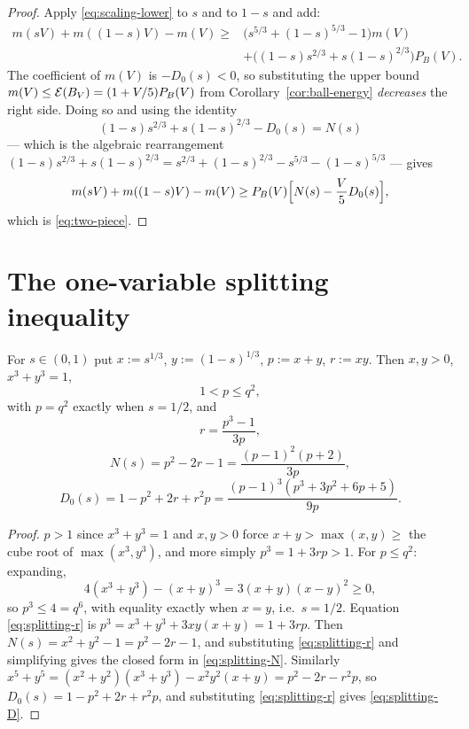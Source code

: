 \begin{proof}
Apply \eqref{eq:scaling-lower} to $s$ and to $1-s$ and add:
\begin{equation}\label{eq:two-piece-raw}
\begin{aligned}
  m(sV)+m((1-s)V)-m(V)
  \ge{}&\bigl(s^{5/3}+(1-s)^{5/3}-1\bigr)m(V)\\
  &+\bigl((1-s)s^{2/3}+s(1-s)^{2/3}\bigr)P_B(V).
\end{aligned}
\end{equation}
The coefficient of $m(V)$ is $-D_0(s)<0$, so substituting the upper bound
$m(V)\le\mathcal E(B_V)=(1+V/5)P_B(V)$ from
Corollary~\ref{cor:ball-energy} \emph{decreases} the right side.  Doing so and
using the identity
\[
  (1-s)s^{2/3}+s(1-s)^{2/3}-D_0(s)
  = N(s)
\]
--- which is the algebraic rearrangement
$(1-s)s^{2/3}+s(1-s)^{2/3}
 =s^{2/3}+(1-s)^{2/3}-s^{5/3}-(1-s)^{5/3}$ --- gives
\[
  m(sV)+m((1-s)V)-m(V)\ge P_B(V)\Bigl[N(s)-\frac V5D_0(s)\Bigr],
\]
which is \eqref{eq:two-piece}.
\end{proof}

\section{The one-variable splitting inequality}

\begin{lemma}\label{lem:splitting-substitution}
For $s\in(0,1)$ put $x:=s^{1/3}$, $y:=(1-s)^{1/3}$, $p:=x+y$, $r:=xy$.  Then
$x,y>0$, $x^3+y^3=1$,
\begin{equation}\label{eq:splitting-p-range}
  1<p\le q^2,
\end{equation}
with $p=q^2$ exactly when $s=1/2$, and
\begin{equation}\label{eq:splitting-r}
  r=\frac{p^3-1}{3p},
\end{equation}
\begin{equation}\label{eq:splitting-N}
  N(s)=p^2-2r-1=\frac{(p-1)^2(p+2)}{3p},
\end{equation}
\begin{equation}\label{eq:splitting-D}
  D_0(s)=1-p^2+2r+r^2p
        =\frac{(p-1)^3(p^3+3p^2+6p+5)}{9p} .
\end{equation}
\end{lemma}

\begin{proof}
$p>1$ since $x^3+y^3=1$ and $x,y>0$ force $x+y>\max(x,y)\ge$ the cube root of
$\max(x^3,y^3)$, and more simply $p^3=1+3rp>1$.  For $p\le q^2$: expanding,
\[
  4(x^3+y^3)-(x+y)^3=3(x+y)(x-y)^2\ge0,
\]
so $p^3\le4=q^6$, with equality exactly when $x=y$, i.e.\ $s=1/2$.
Equation \eqref{eq:splitting-r} is
$p^3=x^3+y^3+3xy(x+y)=1+3rp$.  Then $N(s)=x^2+y^2-1=p^2-2r-1$, and
substituting \eqref{eq:splitting-r} and simplifying gives the closed form in
\eqref{eq:splitting-N}.  Similarly
$x^5+y^5=(x^2+y^2)(x^3+y^3)-x^2y^2(x+y)=p^2-2r-r^2p$, so
$D_0(s)=1-p^2+2r+r^2p$, and substituting \eqref{eq:splitting-r} gives
\eqref{eq:splitting-D}.
\end{proof}

